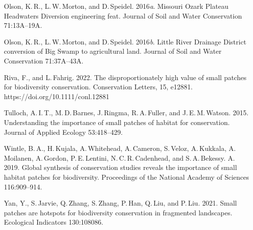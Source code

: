 \begin{hangparas}{1.5em}{1}
	Olson, K.\,R., L.\,W.\,Morton, and D.\,Speidel. 2016\textit{a}. Missouri Ozark Plateau Headwaters Diversion engineering feat. Journal of Soil and Water Conservation 71:13A–19A.
	
	Olson, K.\,R., L.\,W.\,Morton, and D.\,Speidel. 2016\textit{b}. Little River Drainage District conversion of Big Swamp to agricultural land. Journal of Soil and Water Conservation 71:37A–43A.
	
	
	
	Riva, F., and L.\,Fahrig. 2022. The disproportionately high value of small patches for biodiversity conservation. Conservation Letters, 15, e12881. https://doi.org/10.1111/conl.12881
	
	
	Tulloch, A.\,I.\,T., M.\,D.\,Barnes, J.\,Ringma, R.\,A.\,Fuller, and J.\,E.\,M.\,Watson. 2015. Understanding the importance of small patches of habitat for conservation. Journal of Applied Ecology 53:418–429.
	
	Wintle, B.\,A., H.\,Kujala, A.\,Whitehead, A.\,Cameron, S.\,Veloz, A.\,Kukkala, A.\,Moilanen, A.\,Gordon, P.\,E.\,Lentini, N.\,C.\,R.\,Cadenhead, and S.\,A.\,Bekessy. A. 2019. Global synthesis of conservation studies reveals the importance of small habitat patches for biodiversity. Proceedings of the National Academy of Sciences 116:909–914. 
	
	Yan, Y., S.\,Jarvie, Q.\,Zhang, S.\,Zhang, P.\,Han, Q.\,Liu, and P.\,Liu. 2021. Small patches are hotspots for biodiversity conservation in fragmented landscapes. Ecological Indicators 130:108086. 
	
\end{hangparas}


